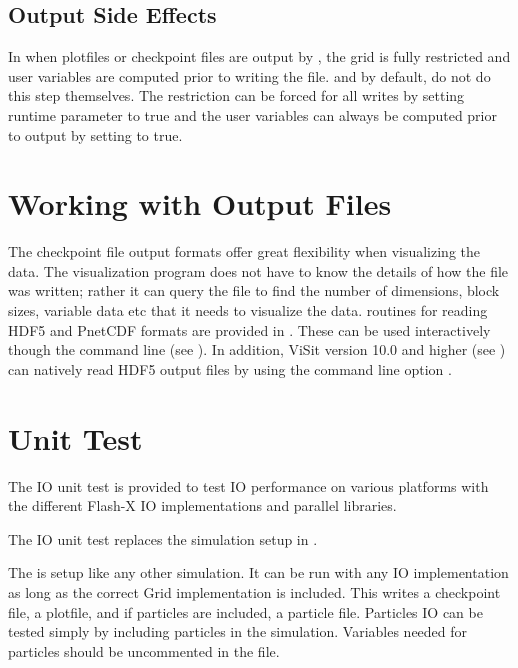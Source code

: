 \subsection{Output Side Effects}
In \flashx when plotfiles or checkpoint files are output by 
, the grid is fully restricted and user variables are
computed prior to writing the file.   and 
 by default, do not do this step themselves.  The restriction
can be forced for all writes by setting runtime parameter  to 
true and the user variables can always be computed prior to output by setting
 to true.  


\section{Working with Output Files}

The checkpoint file output formats offer great flexibility when
visualizing the data. The visualization program does not have to
know the details of how the file was written; rather it can query
the file to find the number of dimensions, block sizes, variable
data etc that it needs to visualize the data.  routines
for reading HDF5 and PnetCDF formats are provided in
.  These can be used interactively though the
 command line (see ).
In addition, ViSit version 10.0 and higher (see ) can natively read 
\flashx HDF5 output files by using the command line option
.


\section{Unit Test}\label{Sec:IO Unit Test}
The \unit{IO} unit test is provided to test IO performance on various platforms
with the different Flash-X IO implementations and parallel libraries.
\begin{flashtip}
The \unit{IO} unit test replaces the simulation setup  in \flashx.
\end{flashtip}

The  is setup like any other \flashx simulation.  It can be run
with any IO implementation as long as the correct Grid implementation
is included.  This  writes a checkpoint file, a plotfile, and
if particles are included, a particle file.
Particles IO can be
tested simply by including particles in the simulation.  Variables needed
for particles should be uncommented in the  file.


